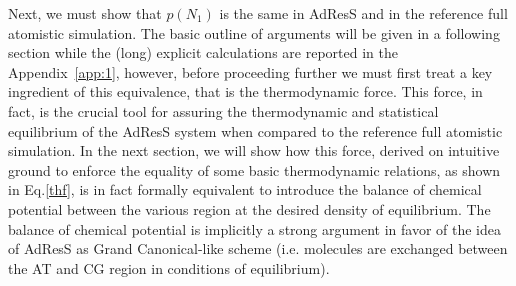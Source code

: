 \documentclass[aip,jcp,a4paper,reprint,onecolumn]{revtex4-1}
\begin{document}
Next, we must show that $p(N_{1})$ is the same in AdResS and in the reference full atomistic simulation. The basic outline of arguments will be given in a following section while the (long) explicit calculations are reported in the Appendix~\ref{app:1}, however, before proceeding further we must first treat a key ingredient of this equivalence, that is the thermodynamic force. This force, in fact, is the crucial tool for assuring the thermodynamic and statistical equilibrium of the AdResS system when compared to the reference full atomistic simulation. In the next section, we will show how this force, derived on intuitive ground to enforce the equality of some basic thermodynamic relations, as shown in Eq.\ref{thf}, is in fact formally equivalent to introduce the balance of chemical potential between the various region at the desired density of equilibrium. The balance of chemical potential is implicitly a strong argument in favor of the idea of AdResS as Grand Canonical-like scheme (i.e. molecules are exchanged between the AT and CG region in conditions of equilibrium). 
\end{document}
